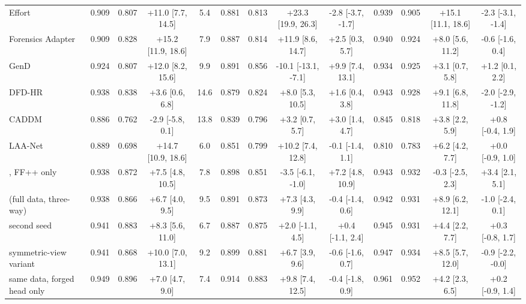 \begin{tabular}{@{}l cccc cccc cccc@{}}
Effort~\cite{effort} & 0.909 & 0.807 & +11.0 [7.7, 14.5] & 5.4 & 0.881 & 0.813 & +23.3 [19.9, 26.3] & -2.8 [-3.7, -1.7] & 0.939 & 0.905 & +15.1 [11.1, 18.6] & -2.3 [-3.1, -1.4] \\
Forensics Adapter~\cite{forensicsadapter} & 0.909 & 0.828 & +15.2 [11.9, 18.6] & 7.9 & 0.887 & 0.814 & +11.9 [8.6, 14.7] & +2.5 [0.3, 5.7] & 0.940 & 0.924 & +8.0 [5.6, 11.2] & -0.6 [-1.6, 0.4] \\
GenD~\cite{gend2026} & 0.924 & 0.807 & +12.0 [8.2, 15.6] & 9.9 & 0.891 & 0.856 & -10.1 [-13.1, -7.1] & +9.9 [7.4, 13.1] & 0.934 & 0.925 & +3.1 [0.7, 5.8] & +1.2 [0.1, 2.2] \\
DFD-HR~\cite{dfdhr2026} & 0.938 & 0.838 & +3.6 [0.6, 6.8] & 14.6 & 0.879 & 0.824 & +8.0 [5.3, 10.5] & +1.6 [0.4, 3.8] & 0.943 & 0.928 & +9.1 [6.8, 11.8] & -2.0 [-2.9, -1.2] \\
CADDM~\cite{caddm} & 0.886 & 0.762 & -2.9 [-5.8, 0.1] & 13.8 & 0.839 & 0.796 & +3.2 [0.7, 5.7] & +3.0 [1.4, 4.7] & 0.845 & 0.818 & +3.8 [2.2, 5.9] & +0.8 [-0.4, 1.9] \\
LAA-Net~\cite{laanet} & 0.889 & 0.698 & +14.7 [10.9, 18.6] & 6.0 & 0.851 & 0.799 & +10.2 [7.4, 12.8] & -0.1 [-1.4, 1.1] & 0.810 & 0.783 & +6.2 [4.2, 7.7] & +0.0 [-0.9, 1.0] \\
\midrule
\ours{}, FF++ only & 0.938 & 0.872 & +7.5 [4.8, 10.5] & 7.8 & 0.898 & 0.851 & -3.5 [-6.1, -1.0] & +7.2 [4.8, 10.9] & 0.943 & 0.932 & -0.3 [-2.5, 2.3] & +3.4 [2.1, 5.1] \\
\ours{} (full data, three-way) & 0.938 & 0.866 & +6.7 [4.0, 9.5] & 9.5 & 0.891 & 0.873 & +7.3 [4.3, 9.9] & -0.4 [-1.4, 0.6] & 0.942 & 0.931 & +8.9 [6.2, 12.1] & -1.0 [-2.4, 0.1] \\
\quad second seed & 0.941 & 0.883 & +8.3 [5.6, 11.0] & 6.7 & 0.887 & 0.875 & +2.0 [-1.1, 4.5] & +0.4 [-1.1, 2.4] & 0.945 & 0.931 & +4.4 [2.2, 7.7] & +0.3 [-0.8, 1.7] \\
\quad symmetric-view variant & 0.941 & 0.868 & +10.0 [7.0, 13.1] & 9.2 & 0.899 & 0.881 & +6.7 [3.9, 9.6] & -0.6 [-1.6, 0.7] & 0.947 & 0.934 & +8.5 [5.7, 12.0] & -0.9 [-2.2, -0.0] \\
same data, forged head only & 0.949 & 0.896 & +7.0 [4.7, 9.0] & 7.4 & 0.914 & 0.883 & +9.8 [7.4, 12.5] & -0.4 [-1.8, 0.9] & 0.961 & 0.952 & +4.2 [2.3, 6.5] & +0.2 [-0.9, 1.4] \\
\bottomrule
\end{tabular}
